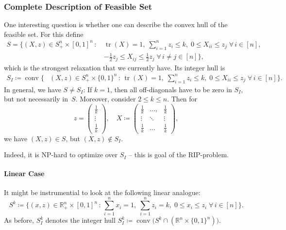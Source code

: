 \documentclass[10pt, a4paper]{article}
\DeclareMathOperator{\conv}{conv}
\DeclareMathOperator{\tr}{tr}
\newcommand{\suchthat}{\,:\,}
\newcommand{\define}{\coloneqq}
\newcommand{\R}{\mathds{R}}
\begin{document}
\subsubsection{Complete Description of Feasible Set}

One interesting question is whether one can describe the convex hull of the
feasible set. For this define
\begin{align*}
  S = \Big\{(X,z) \in S^n_+ \times [0,1]^n \suchthat & \tr(X) = 1,\; \sum_{i=1}^n z_i \leq k,\;     0 \leq X_{ii} \leq z_j \;\forall\, i \in [n],\\
                                                     & -\tfrac{1}{2} z_j \leq X_{ij} \leq \tfrac{1}{2} z_j \;\forall\, i \neq j \in [n] \Big\},
\end{align*}
which is the strongest relaxation that we currently have. Its integer hull is
\begin{align*}
  S_I \define \conv \Big\{& (X,z) \in S^n_+ \times \{0,1\}^n \suchthat \tr(X) =
                1,\; \sum_{i=1}^n z_i \leq k,\; 0 \leq X_{ii} \leq z_j \;\forall\, i \in [n] \Big\}.
\end{align*}
In general, we have $S \neq S_I$: If $k = 1$, then all off-diagonals have
to be zero in $S_I$, but not necessarily in~$S$. Moreover, consider
$2 \leq k \leq n$. Then for
\[
  z = \begin{pmatrix}
    \tfrac{1}{k} \\
    \vdots\\
    \tfrac{1}{k}
  \end{pmatrix},\quad
  X \define
  \begin{pmatrix}
    \tfrac{1}{k} & \dots, & \tfrac{1}{k}\\
    \vdots & \ddots & \vdots\\
    \tfrac{1}{k} & \dots & \tfrac{1}{k}
  \end{pmatrix},
\]
we have $(X,z) \in S$, but $(X,z) \notin S_I$.

Indeed, it is NP-hard to optimize over $S_I$ -- this is goal of the
RIP-problem.


\paragraph{Linear Case}

It might be instrumential to look at the following linear analogue:
\[
S^k \define \{(x,z) \in \R_+^n \times [0,1]^n \suchthat \sum_{i=1}^n x_i =
1,\; \sum_{i=1}^n z_i = k,\; 0 \leq x_i \leq z_i \;\forall\, i \in [n]\}.
\]
As before, $S^k_I$ denotes the integer hull
$S^k_I \define \conv\big(S^k \cap (\R^n \times \{0,1\}^n)\big)$.
\end{document}
